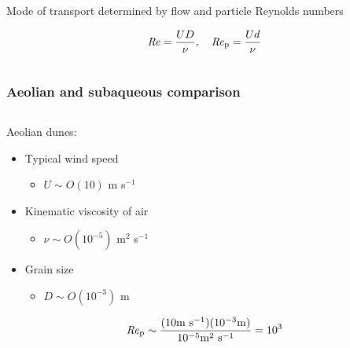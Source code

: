 \documentclass{beamer}
\newcommand\Rey{\mbox{\textit{Re}}}  %
\begin{document}
\begin{frame}
\begin{columns}[t]
\begin{column}{0.5\textwidth}
      Mode of transport determined by flow and particle Reynolds numbers

      \vspace{-0.1cm}

      \begin{equation}
        \Rey = \frac{U D}{\nu}, \quad \Rey_{\text{p}} = \frac{U d}{\nu} \nonumber
      \end{equation}

    \end{column}

  \end{columns}




\end{frame}

\begin{frame}
  \frametitle{Aeolian and subaqueous comparison}

  \vspace{-1cm}

  \begin{columns}[t]

    \begin{column}{0.5\textwidth}

      \centering

      Aeolian dunes:

      \begin{itemize}
      \item Typical wind speed 
        \begin{itemize}
        \item $U \sim O(10)$ m s$^{-1}$
        \end{itemize}
      \item Kinematic viscosity of air 
        \begin{itemize}
        \item $\nu \sim O(10^{-5})$ m$^{2}$ s$^{-1}$
        \end{itemize}
      \item Grain size 
        \begin{itemize}
        \item $D \sim O(10^{-3})$ m
        \end{itemize}
      \end{itemize}

      \begin{equation}
        \Rey_{\text{p}} \sim \frac{(10 \text{m s}^{-1})(10^{-3} \text{m})}{10^{-5} \text{m}^{2} \text{ s}^{-1}} = 10^{3} \nonumber
      \end{equation}


\end{column}
\end{columns}
\end{frame}
\end{document}
